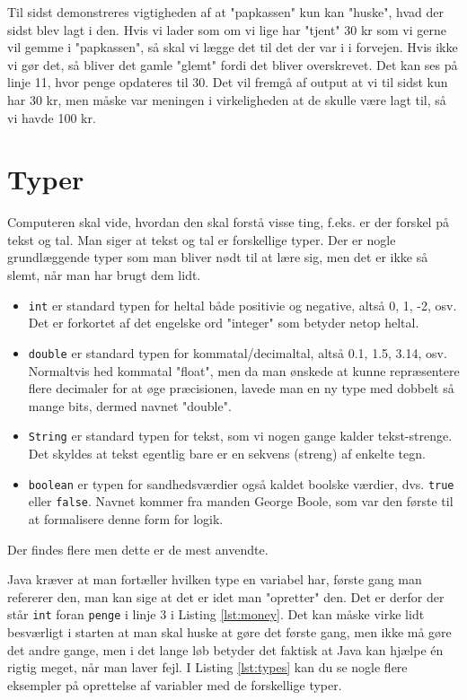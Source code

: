 Til sidst demonstreres vigtigheden af at "papkassen" kun kan "huske", hvad der sidst blev lagt i den. Hvis vi lader som om vi lige har "tjent" 30 kr som vi gerne vil gemme i "papkassen", så skal vi lægge det til det der var i i forvejen. Hvis ikke vi gør det, så bliver det gamle "glemt" fordi det bliver overskrevet. Det kan ses på linje 11, hvor penge opdateres til 30. Det vil fremgå af output at vi til sidst kun har 30 kr, men måske var meningen i virkeligheden at de skulle være lagt til, så vi havde 100 kr.

\section{Typer}
Computeren skal vide, hvordan den skal forstå visse ting, f.eks. er der forskel på tekst og tal. Man siger at tekst og tal er forskellige typer. Der er nogle grundlæggende typer som man bliver nødt til at lære sig, men det er ikke så slemt, når man har brugt dem lidt.

\begin{itemize}
	\item \texttt{int} er standard typen for heltal både positivie og negative, altså 0, 1, -2, osv. Det er forkortet af det engelske ord "integer" som betyder netop heltal.
	\item \texttt{double} er standard typen for kommatal/decimaltal, altså 0.1, 1.5, 3.14, osv. Normaltvis hed kommatal "float", men da man ønskede at kunne repræsentere flere decimaler for at øge præcisionen, lavede man en ny type med dobbelt så mange bits, dermed navnet "double".
	\item \texttt{String} er standard typen for tekst, som vi nogen gange kalder tekst-strenge. Det skyldes at tekst egentlig bare er en sekvens (streng) af enkelte tegn.
	\item \texttt{boolean} er typen for sandhedsværdier også kaldet boolske værdier, dvs. \texttt{true} eller \texttt{false}. Navnet kommer fra manden George Boole, som var den første til at formalisere denne form for logik.
\end{itemize}

Der findes flere men dette er de mest anvendte.

Java kræver at man fortæller hvilken type en variabel har, første gang man refererer den, man kan sige at det er idet man "opretter" den. Det er derfor der står \texttt{int} foran \texttt{penge} i linje 3 i Listing \ref{lst:money}. Det kan måske virke lidt besværligt i starten at man skal huske at gøre det første gang, men ikke må gøre det andre gange, men i det lange løb betyder det faktisk at Java kan hjælpe én rigtig meget, når man laver fejl. I Listing \ref{lst:types} kan du se nogle flere eksempler på oprettelse af variabler med de forskellige typer.


